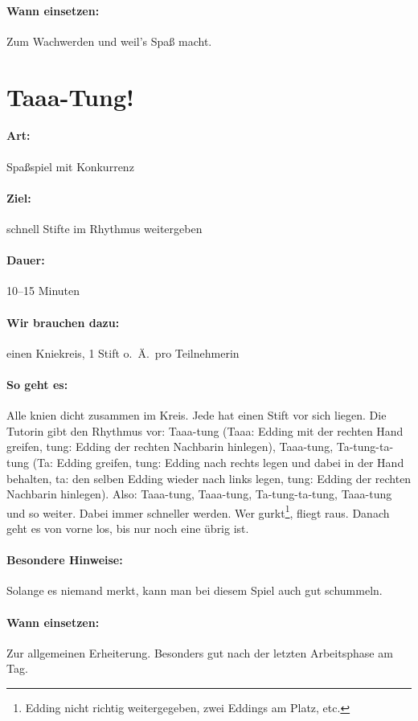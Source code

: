 \paragraph{Wann einsetzen:} Zum Wachwerden und weil's Spaß macht.

\section{Taaa-Tung!}
\paragraph{Art:} Spaßspiel mit Konkurrenz
\paragraph{Ziel:} schnell Stifte im Rhythmus weitergeben
\paragraph{Dauer:} 10--15 Minuten
\paragraph{Wir brauchen dazu:} einen Kniekreis, 1 Stift o.~Ä.~pro Teilnehmerin
\paragraph{So geht es:} Alle knien dicht zusammen im Kreis. Jede hat einen Stift vor sich liegen. Die Tutorin gibt den Rhythmus vor: Taaa-tung (Taaa: Edding mit der rechten Hand greifen, tung: Edding der rechten Nachbarin hinlegen), Taaa-tung, Ta-tung-ta-tung (Ta: Edding greifen, tung: Edding nach rechts legen und dabei in der Hand behalten, ta: den selben Edding wieder nach links legen, tung: Edding der rechten Nachbarin hinlegen). Also: Taaa-tung, Taaa-tung, Ta-tung-ta-tung, Taaa-tung und so weiter. Dabei immer schneller werden. Wer gurkt\footnote{Edding nicht richtig weitergegeben, zwei Eddings am Platz, etc.}, fliegt raus. Danach geht es von vorne los, bis nur noch eine übrig ist.
\paragraph{Besondere Hinweise:} Solange es niemand merkt, kann man bei diesem Spiel auch gut schummeln.
\paragraph{Wann einsetzen:} Zur allgemeinen Erheiterung. Besonders gut nach der letzten Arbeitsphase am Tag.

